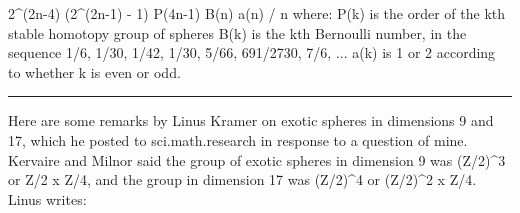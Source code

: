 2^(2n-4) (2^(2n-1) - 1) P(4n-1) B(n) a(n) / n
where:
P(k)    is the order of the kth stable homotopy group of spheres
B(k)      is the kth Bernoulli number, in the sequence
           1/6, 1/30, 1/42, 1/30, 5/66, 691/2730, 7/6, ...
a(k)      is 1 or 2 according to whether k is even or odd.
\par\noindent\rule{\textwidth}{0.4pt}
Here are some remarks by Linus Kramer on exotic spheres in 
dimensions 9 and 17, which he posted to sci.math.research in
response to a question of mine.  Kervaire and Milnor said the group
of exotic spheres in dimension 9 was (Z/2)^{3} or Z/2 x Z/4,
and the group in dimension 17 was (Z/2)^{4} or (Z/2)^{2} 
x Z/4. Linus writes:



